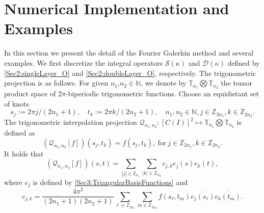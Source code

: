 \documentclass{article}
\newcommand{\abs}[1]{\left\vert#1\right\vert}
\begin{document}
	\section{Numerical Implementation and Examples}
	In this section we present the detail of the Fourier Galerkin method and several examples. 
	We first discretize the integral operators $\mathcal{S}(\kappa)$ and $\mathcal{D}(\kappa)$ defined by \eqref{Sec2:singleLayer_O} and \eqref{Sec2:doubleLayer_O}, respectively. The trigonometric projection is as follows. For given $n_1$,$n_2\in \mathbb{N}$, we denote by $\mathbb{T}_{n_1}\bigotimes\mathbb{T}_{n_2}$ the tensor product space of $2\pi$-biperiodic trigonometric functions. Choose an equidistant set of knots 
	\[
	s_j :=2\pi j/(2n_1+1), \quad t_k:=2\pi k/(2n_2+1),\quad n_1, n_2\in\mathbb{N}, j\in\mathbb{Z}_{2n_1}, k\in\mathbb{Z}_{2n_2}.
	\] 
	The trigonometric interpolation projection
	$\mathcal{Q}_{n_1,n_2}: [C(I)]^2\mapsto\mathbb{T}_{n_1}\bigotimes\mathbb{T}_{n_2}$ is defined as
	\begin{equation*}
		(\mathcal{Q}_{n_1,n_2}[f])(s_j,t_k)=f(s_j,t_k),~\text{for}~j\in\mathbb{Z}_{2n_1}, k\in\mathbb{Z}_{2n_2}.
	\end{equation*}
	It holds that 
	\begin{equation*}\label{sec4:InterpolationPro}
		(\mathcal{Q}_{n_1,n_2}[f])(s,t)=\sum_{\abs{j}\in\mathbb{Z}_{n_1}}\sum_{\abs{k}\in\mathbb{Z}_{n_2}}c_{j,k}e_j(s)e_k(t),
	\end{equation*} 
	where $e_j$ is defined by \eqref{Sec3:TriangularBasisFunctions}  and
	\begin{equation*}
		c_{j,k}=\dfrac{4\pi^2}{(2n_1+1)(2n_2+1)}\sum_{\ell\in\mathbb{Z}_{2n_1}}
		\sum_{m\in\mathbb{Z}_{2n_2}}f(s_\ell,t_m)\overline{e_{j}(s_\ell)}\overline{e_{k}(t_m)}.
	\end{equation*}	
	
\end{document}
